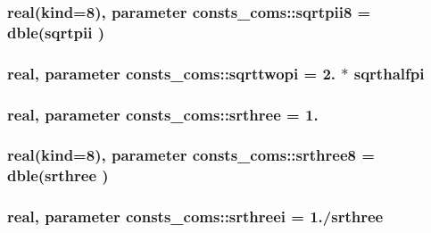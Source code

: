 \subsubsection[{\texorpdfstring{sqrtpii8}{sqrtpii8}}]{\setlength{\rightskip}{0pt plus 5cm}real(kind=8), parameter consts\+\_\+coms\+::sqrtpii8 = dble({\bf sqrtpii} )}\hypertarget{namespaceconsts__coms_ac4df29a8f6a46e9631d4db71c20e8f7d}{}\label{namespaceconsts__coms_ac4df29a8f6a46e9631d4db71c20e8f7d}
\subsubsection[{\texorpdfstring{sqrttwopi}{sqrttwopi}}]{\setlength{\rightskip}{0pt plus 5cm}real, parameter consts\+\_\+coms\+::sqrttwopi = 2. $\ast$ {\bf sqrthalfpi}}\hypertarget{namespaceconsts__coms_a7a26b6224c394bb825fefb5da925c95b}{}\label{namespaceconsts__coms_a7a26b6224c394bb825fefb5da925c95b}
\subsubsection[{\texorpdfstring{srthree}{srthree}}]{\setlength{\rightskip}{0pt plus 5cm}real, parameter consts\+\_\+coms\+::srthree = 1.}\hypertarget{namespaceconsts__coms_a17913c8f0ccea4623bad63371995c51f}{}\label{namespaceconsts__coms_a17913c8f0ccea4623bad63371995c51f}
\subsubsection[{\texorpdfstring{srthree8}{srthree8}}]{\setlength{\rightskip}{0pt plus 5cm}real(kind=8), parameter consts\+\_\+coms\+::srthree8 = dble({\bf srthree} )}\hypertarget{namespaceconsts__coms_a8dbf0a0b3abb2d077c183c16821735b9}{}\label{namespaceconsts__coms_a8dbf0a0b3abb2d077c183c16821735b9}
\subsubsection[{\texorpdfstring{srthreei}{srthreei}}]{\setlength{\rightskip}{0pt plus 5cm}real, parameter consts\+\_\+coms\+::srthreei = 1./{\bf srthree}}\hypertarget{namespaceconsts__coms_a448722d61ca70f7d3d572048be47c1e5}{}\label{namespaceconsts__coms_a448722d61ca70f7d3d572048be47c1e5}
